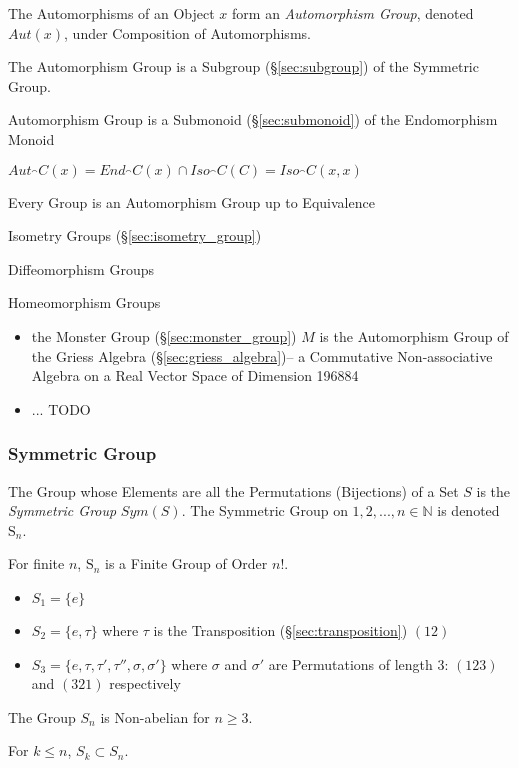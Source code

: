 The Automorphisms of an Object $x$ form an \emph{Automorphism Group},
denoted $Aut(x)$, under Composition of Automorphisms.

The Automorphism Group is a Subgroup (\S\ref{sec:subgroup}) of the
Symmetric Group.

Automorphism Group is a Submonoid (\S\ref{sec:submonoid})
of the Endomorphism Monoid %

$Aut_\cat{C}(x) = End_\cat{C}(x) \cap Iso_\cat{C}(C) = Iso_\cat{C}(x,x)$

Every Group is an Automorphism Group up to Equivalence %

Isometry Groups (\S\ref{sec:isometry_group})

Diffeomorphism Groups %

Homeomorphism Groups %

\begin{itemize}
\item the Monster Group (\S\ref{sec:monster_group}) $M$ is the Automorphism
  Group of the Griess Algebra (\S\ref{sec:griess_algebra})-- a Commutative
  Non-associative Algebra on a Real Vector Space of Dimension 196884
\item ... TODO
\end{itemize}



\subsubsection{Symmetric Group}\label{sec:symmetric_group}

The Group whose Elements are all the Permutations (Bijections) of a
Set $S$ is the \emph{Symmetric Group} $Sym(S)$. The Symmetric Group on
${1, 2, ..., n} \in \mathbb{N}$ is denoted $\mathrm{S}_n$.

For finite $n$, $\mathrm{S}_n$ is a Finite Group of Order $n!$.

\begin{itemize}
    \item $S_1 = \{e\}$
    \item $S_2 = \{e,\tau\}$ where $\tau$ is the Transposition
      (\S\ref{sec:transposition}) $(12)$
    \item $S_3 = \{e, \tau, \tau', \tau'', \sigma, \sigma'\}$ where
      $\sigma$ and $\sigma'$ are Permutations of length 3: $(123)$ and
      $(321)$ respectively
\end{itemize}
The Group $S_n$ is Non-abelian for $n \geq 3$.

For $k \leq n$, $S_k \subset S_n$.

